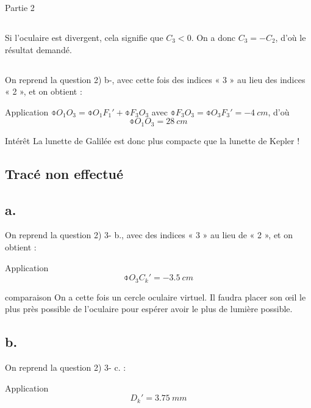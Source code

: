 \documentclass[../main/main.tex]{subfiles}
\begin{document}
\begin{center}
    \huge Partie 2
\end{center}

\subsection{}
Si l'oculaire est divergent, cela signifie que $C_3 < 0$. On a donc $C_3 = -
C_2$, d'où le résultat demandé.

\subsection{}
On reprend la question 2) b-, avec cette fois des indices « 3 » au lieu des
indices « 2 », et on obtient :

\begin{NCexem}{Application}
    $\obar{O_1O_3} = \obar{O_1F_1'} + \obar{F_3O_3}$ avec $\obar{F_3O_3} =
    \obar{O_3F_3'} = \SI{-4}{cm}$, d'où
    \[ \boxed{\obar{O_1O_3} = \SI{+28}{cm}} \]
\end{NCexem}

\begin{inte}{Intérêt}
    La lunette de Galilée est donc plus compacte que la lunette de Kepler !
\end{inte}

\subsection{Tracé non effectué}

\subsection{a.}
On reprend la question 2) 3- b., avec des indices « 3 » au lieu de « 2 », et on
obtient :
\begin{NCexem}{Application}
    \[ \boxed{\obar{O_3C_k'} = \SI{-3.5}{cm}}\]
\end{NCexem}

\begin{rema}{comparaison}
    On a cette fois un cercle oculaire virtuel. Il faudra placer son œil le plus
    près possible de l'oculaire pour espérer avoir le plus de lumière possible.
\end{rema}

\setcounter{subsection}{6}
\subsection{b.}
On reprend la question 2) 3- c. :
\begin{NCexem}{Application}
    \[ \boxed{D_k' = \SI{3.75}{mm}} \]
\end{NCexem}
\end{document}
